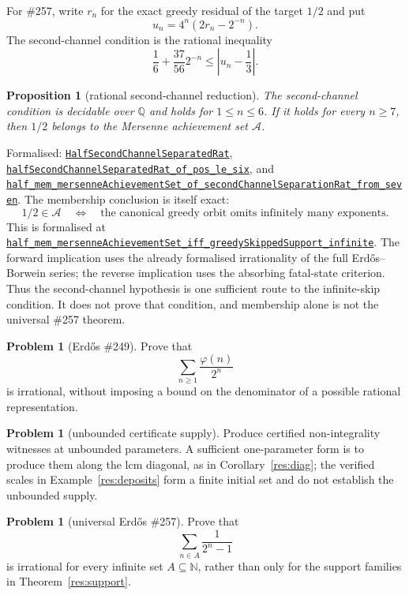 \documentclass[11pt]{article}
\newcommand{\commit}{81150c1c6fdd4cd51e76d3aa0de344341e0e9e7c}
\newcommand{\repobase}{https://github.com/wcook04/plectis-lean-erdos249-257/blob/\commit}
\newcommand{\PK}{Erdos249257}
\newcommand{\lref}[3]{\href{\repobase/\PK/#1\#L#2}{\nolinkurl{#3}}}
\newcommand{\lrefx}[3]{\href{\repobase/\PK/#1\#L#2}{\nolinkurl{#3}}}
\newtheorem{proposition}[theorem]{Proposition}
\theoremstyle{definition}
\newtheorem{problem}[theorem]{Problem}
\theoremstyle{remark}
\newcommand{\N}{\mathbb{N}}
\newcommand{\Q}{\mathbb{Q}}
\newcommand{\ph}{\varphi}
\begin{document}
For \#257, write $r_n$ for the exact greedy residual of the target $1/2$ and
put
\[
  u_n=4^n(2r_n-2^{-n}).
\]
The second-channel condition is the rational inequality
\[
  \frac16+\frac{37}{56}2^{-n}\le \left|u_n-\frac13\right|.
\]

\begin{proposition}[rational second-channel reduction]\label{res:secondfrontier}
The second-channel condition is decidable over $\Q$ and holds for
$1\le n\le6$.  If it holds for every $n\ge7$, then
$1/2$ belongs to the Mersenne achievement set $\mathcal A$.
\end{proposition}
\noindent Formalised:
\lrefx{GreedyAchievementSet.lean}{2695}{HalfSecondChannelSeparatedRat},
\lrefx{GreedyAchievementSet.lean}{2723}{halfSecondChannelSeparatedRat_of_pos_le_six},
and
\lref{GreedyAchievementSet.lean}{2901}{half_mem_mersenneAchievementSet_of_secondChannelSeparationRat_from_seven}.
The membership conclusion is itself exact:
\[
  1/2\in\mathcal A
  \quad\Longleftrightarrow\quad
  \text{the canonical greedy orbit omits infinitely many exponents}.
\]
This is formalised at
\lref{GreedyAchievementSet.lean}{2514}{half_mem_mersenneAchievementSet_iff_greedySkippedSupport_infinite}.
The forward implication uses the already formalised irrationality of the full
Erd\H{o}s--Borwein series; the reverse implication uses the absorbing fatal-state
criterion.  Thus the second-channel hypothesis is one sufficient route to the
infinite-skip condition.  It does not prove that condition, and membership alone
is not the universal \#257 theorem.

\begin{problem}[Erd\H{o}s \#249]
Prove that
\[
  \sum_{n\ge1}\frac{\ph(n)}{2^n}
\]
is irrational, without imposing a bound on the denominator of a possible
rational representation.
\end{problem}

\begin{problem}[unbounded certificate supply]
Produce certified non-integrality witnesses at unbounded parameters.  A
sufficient one-parameter form is to produce them along the lcm diagonal, as
in Corollary~\ref{res:diag}; the verified scales in
Example~\ref{res:deposits} form a finite initial set and do not establish the
unbounded supply.
\end{problem}

\begin{problem}[universal Erd\H{o}s \#257]
Prove that
\[
  \sum_{n\in A}\frac{1}{2^n-1}
\]
is irrational for every infinite set $A\subseteq\N$, rather than only for the
support families in Theorem~\ref{res:support}.
\end{problem}
\end{document}
